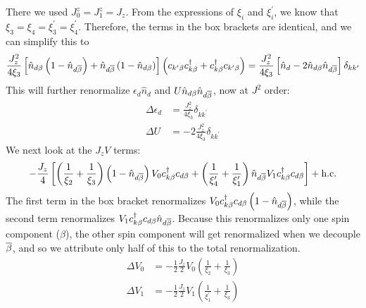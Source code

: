 \documentclass[12pt,twoside]{report}
\numberwithin{equation}{section}
\begin{document}
There we used \(J_0^z = J_1^z = J_z\). From the expressions of \(\xi_i\) and \(\xi_i^\prime\), we know that \(\xi_3 = \xi_4 = \xi_3^\prime = \xi_4^\prime\). Therefore, the terms in the box brackets are identical, and we can simplify this to
\begin{equation}\begin{aligned}
	\frac{J_z^2}{4\xi_3}\left[\hat n_{d\beta}\left( 1 - \hat n_{d\overline\beta} \right) + \hat n_{d\overline\beta}\left( 1 - \hat n_{d\beta} \right) \right]\left(c_{k^\prime\beta}c^\dagger_{k\beta} + c^\dagger_{k\beta}c_{k^\prime\beta}\right) = \frac{J_z^2}{4\xi_3}\left[\hat n_{d} - 2\hat n_{d\beta}\hat n_{d\overline\beta} \right]\delta_{kk^\prime}
\end{aligned}\end{equation}
This will further renormalize \(\epsilon_d \hat n_d\) and \(U\hat n_{d\beta}\hat n_{d\overline\beta}\), now at \(J^2\) order:
\begin{equation}\begin{aligned}
	\label{edU2}
	\Delta \epsilon_d &= \frac{J_z^2}{4\xi_3}\delta_{kk^\prime}\\
	\Delta U &= -2\frac{J_z^2}{4\xi_3}\delta_{kk^\prime}
\end{aligned}\end{equation}
We next look at the \(J_z V\) terms:
\begin{equation}\begin{aligned}
	-\frac{J_z}{4}\left[\left(\frac{1}{\xi_2} + \frac{1}{\xi_3}\right)\left(1 - \hat n_{d\overline\beta}\right)V_0 c^\dagger_{k\beta}c_{d\beta} + \left(\frac{1}{\xi^\prime_4} + \frac{1}{\xi^\prime_1}\right)\hat n_{d\overline\beta} V_1 c^\dagger_{k\beta}c_{d\beta}\right] + \text{h.c.}
\end{aligned}\end{equation}
The first term in the box bracket renormalizes \(V_0 c^\dagger_{k\beta}c_{d\beta}\left(1 - \hat n_{d\overline\beta}\right)\), while the second term renormalizes \(V_1 c^\dagger_{k\beta}c_{d\beta}\hat n_{d\overline\beta}\). Because this renormalizes only one spin component (\(\beta\)), the other spin component will get renormalized when we decouple \(\overline\beta\), and so we attribute only half of this to the total renormalization.
\begin{equation}\begin{aligned}
	\Delta V_0 &= -\frac{1}{2}\frac{J_z}{2}V_0\left(\frac{1}{\xi_2} + \frac{1}{\xi_3}\right)\\
	\Delta V_1 &= -\frac{1}{2}\frac{J_z}{2}V_1\left(\frac{1}{\xi^\prime_1} + \frac{1}{\xi_3}\right)
\end{aligned}\end{equation}
\end{document}
